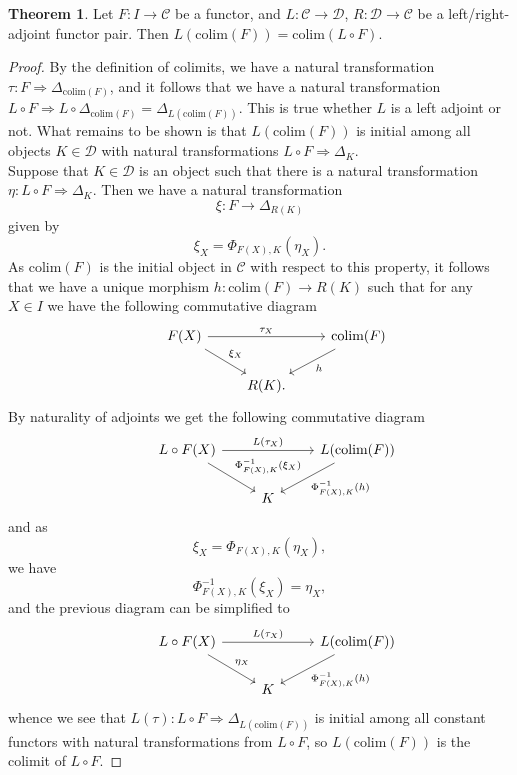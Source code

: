 \documentclass{article}
\theoremstyle{definition}
\newtheorem{theorem}{Theorem}[subsection]
\newcommand{\colim}{\text{colim}}
\begin{document}
\begin{theorem}
	Let $F : I \to \mathcal{C}$ be a functor, and $L : \mathcal{C} \to
	\mathcal{D}$, $R : \mathcal{D} \to \mathcal{C}$ be a left/right-adjoint
	functor pair. Then $L(\colim(F)) = \colim(L \circ F)$.
\end{theorem}
\begin{proof}
	By the definition of colimits, we have a natural transformation $\tau : F
	\Rightarrow \Delta_{\colim(F)}$, and it follows that we have a natural
	transformation $L \circ F \Rightarrow L \circ \Delta_{\colim(F)} =
	\Delta_{L(\colim(F))}$. This is true whether $L$ is a left adjoint or not.
	What remains to be shown is that $L(\colim(F))$ is initial among all objects
	$K \in \mathcal{D}$ with natural transformations $L \circ F \Rightarrow
	\Delta_K$. \\

	Suppose that $K \in \mathcal{D}$ is an object such that there is a natural
	transformation $\eta : L \circ F \Rightarrow \Delta_K$. Then we have a
	natural transformation
	\[
		\xi : F \rightarrow \Delta_{R(K)}
	\]
	given by 
	\[
		\xi_X = \Phi_{F(X), K}(\eta_X).
	\] 
	As $\colim(F)$ is the initial object in $\mathcal{C}$ with respect to this
	property, it follows that we have a unique morphism $h : \colim(F) \to
	R(K)$ such that for any $X \in I$ we have the following commutative diagram
	\[
	\begin{tikzcd}
		& F(X)
		\ar{rr}{\tau_X}
		\ar{dr}{\xi_X}
		& & \colim(F)
		\ar{dl}{h}
		\\
		& & R(K).
	\end{tikzcd}
	\] 
	By naturality of adjoints we get the following commutative diagram
	\[
	\begin{tikzcd}
		& L \circ F(X)
		\ar{rr}{L(\tau_X)}
		\ar{dr}{\Phi_{F(X), K}^{-1}(\xi_X)}
		& & L(\colim(F))
		\ar{dl}{\Phi_{F(X), K}^{-1}(h)}
		\\
		& & K
	\end{tikzcd}
	\]
	and as
	\[
		\xi_X = \Phi_{F(X), K}(\eta_X),
	\] 
	we have
	\[
		\Phi_{F(X), K}^{-1}(\xi_X) = \eta_X,
	\] 
	and the previous diagram can be simplified to
	\[
	\begin{tikzcd}
		& L \circ F(X)
		\ar{rr}{L(\tau_X)}
		\ar{dr}{\eta_X}
		& & L(\colim(F))
		\ar{dl}{\Phi_{F(X), K}^{-1}(h)}
		\\
		& & K
	\end{tikzcd}
	\] 
	whence we see that $L(\tau) : L \circ F \Rightarrow \Delta_{L(\colim(F))}$
	is initial among all constant functors with natural transformations from $L \circ F$,
	so $L(\colim(F))$ is the colimit of $L \circ F$.
\end{proof}
\end{document}
